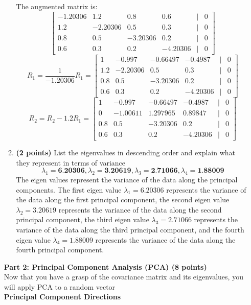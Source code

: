 \documentclass[a3paper,12pt]{extarticle} %
\begin{document}
\begin{enumerate}
\begin{enumerate}
\[        \]
        The augmented matrix is:
        \[
        \begin{bmatrix}-1.20306 & 1.2 & 0.8 & 0.6 & | & 0\\1.2 & -2.20306 & 0.5 & 0.3 & | & 0\\0.8 & 0.5 & -3.20306 & 0.2 & | & 0\\0.6 & 0.3 & 0.2 & -4.20306 & | & 0\end{bmatrix}
        \]
        \[
        R_1 = \frac{1}{-1.20306}R_1 = \begin{bmatrix}1 & -0.997 & -0.66497 & -0.4987 & | & 0\\1.2 & -2.20306 & 0.5 & 0.3 & | & 0\\0.8 & 0.5 & -3.20306 & 0.2 & | & 0\\0.6 & 0.3 & 0.2 & -4.20306 & | & 0\end{bmatrix}
        \]
        \[
        R_2 = R_2 - 1.2R_1 = \begin{bmatrix}1 & -0.997 & -0.66497 & -0.4987 & | & 0\\0 & -1.00611 & 1.297965 & 0.89847 & | & 0\\0.8 & 0.5 & -3.20306 & 0.2 & | & 0\\0.6 & 0.3 & 0.2 & -4.20306 & | & 0\end{bmatrix}
        \]
        \item \textbf{(2 points)} List the eigenvalues in descending order and explain what they represent in terms of variance
        \[
        \lambda_1 = \textbf{6.20306}, \lambda_2 = \textbf{3.20619}, \lambda_3 = \textbf{2.71066}, \lambda_4 = \textbf{1.88009}
        \]
        The eigen values represent the variance of the data along the principal components. The first eigen value \(\lambda_1 = 6.20306\) represents the variance of the data along the first principal component, the second eigen value \(\lambda_2 = 3.20619\) represents the variance of the data along the second principal component, the third eigen value \(\lambda_3 = 2.71066\) represents the variance of the data along the third principal component, and the fourth eigen value \(\lambda_4 = 1.88009\) represents the variance of the data along the fourth principal component.
    \end{enumerate} 
    \subitem \textbf{Part 2: Principal Component Analysis (PCA) (8 points)}
    \\ Now that you have a grasp of the covariance matrix and its eigenvalues, you will apply PCA to a random vector
    \\ \subitem \textbf{Principal Component Directions}
    \begin{enumerate}

\end{enumerate}
\end{enumerate}
\end{document}
